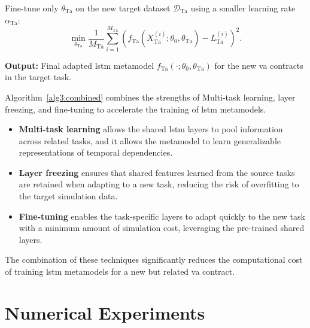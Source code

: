 \begin{algorithm}
\begin{algorithmic}[1]
        \STATE Fine-tune only $\theta_{\text{Ta}}$ on the new target dataset $\mathcal{D}_{\text{Ta}}$ using a smaller learning rate $\alpha_{\text{Ta}}$:
        \begin{equation}
            \min_{\theta_{\text{Ta}}} \frac{1}{M_{\text{Ta}}} \sum_{i=1}^{M_{\text{Ta}}} \left( f_{\text{Ta}}(X_{\text{Ta}}^{(i)}; \theta_0, \theta_{\text{Ta}}) - L_{\text{Ta}}^{(i)} \right)^2.
        \end{equation}
        
        \STATE \textbf{Output:} Final adapted \gls{lstm} metamodel $f_{\text{Ta}}(\cdot; \theta_0, \theta_{\text{Ta}})$ for the new \gls{va} contracts in the target task.
    \end{algorithmic}
    \end{algorithm}

Algorithm~\ref{alg3:combined} combines the strengths of Multi-task learning, layer freezing, and fine-tuning to accelerate the training of \gls{lstm} metamodels. 

\begin{itemize}
    \item \textbf{Multi-task learning} allows the shared \gls{lstm} layers to pool information across related tasks, and it allows the metamodel to learn generalizable representations of temporal dependencies.
    \item \textbf{Layer freezing} ensures that shared features learned from the source tasks are retained when adapting to a new task, reducing the risk of overfitting to the target simulation data.
    \item \textbf{Fine-tuning} enables the task-specific layers to adapt quickly to the new task with a minimum amount of simulation cost, leveraging the pre-trained shared layers.

\end{itemize}
    
The combination of these techniques significantly reduces the computational cost of training \gls{lstm} metamodels for a new but related \gls{va} contract.

\section{Numerical Experiments} \label{sec3:experiments}

